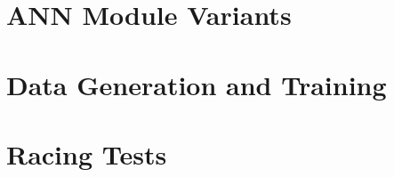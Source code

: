 \section{ANN Module Variants}

\section{Data Generation and Training}

\section{Racing Tests}







\section{}